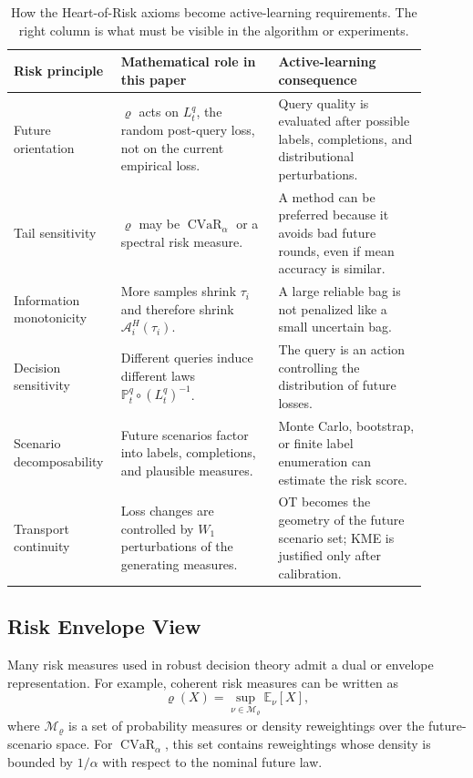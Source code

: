 \documentclass[10pt,journal]{IEEEtran}
\DeclareMathOperator{\CVaR}{CVaR}
\newcommand{\E}{\mathbb{E}}
\newcommand{\Prob}{\mathbb{P}}
\newcommand{\Mcal}{\mathcal{M}}
\newcommand{\risk}{\varrho}
\newcommand{\Acal}{\mathcal{A}}
\begin{document}
\begin{table}[t]
\centering
\caption{How the Heart-of-Risk axioms become active-learning requirements. The right column is what must be visible in the algorithm or experiments.}
\label{tab:hr-axioms-dal}
\small
\begin{tabular}{p{0.20\linewidth}p{0.36\linewidth}p{0.34\linewidth}}
\toprule
Risk principle & Mathematical role in this paper & Active-learning consequence \\
\midrule
Future orientation & $\risk$ acts on $L_t^q$, the random post-query loss, not on the current empirical loss. & Query quality is evaluated after possible labels, completions, and distributional perturbations. \\
Tail sensitivity & $\risk$ may be $\CVaR_\alpha$ or a spectral risk measure. & A method can be preferred because it avoids bad future rounds, even if mean accuracy is similar. \\
Information monotonicity & More samples shrink $\tau_i$ and therefore shrink $\Acal_i^H(\tau_i)$. & A large reliable bag is not penalized like a small uncertain bag. \\
Decision sensitivity & Different queries induce different laws $\Prob_t^q\circ(L_t^q)^{-1}$. & The query is an action controlling the distribution of future losses. \\
Scenario decomposability & Future scenarios factor into labels, completions, and plausible measures. & Monte Carlo, bootstrap, or finite label enumeration can estimate the risk score. \\
Transport continuity & Loss changes are controlled by $W_1$ perturbations of the generating measures. & OT becomes the geometry of the future scenario set; KME is justified only after calibration. \\
\bottomrule
\end{tabular}
\end{table}

\subsection{Risk Envelope View}
\label{subsec:risk-envelope}

Many risk measures used in robust decision theory admit a dual or envelope representation. For example, coherent risk measures can be written as
\begin{equation}
\label{eq:risk-envelope}
    \risk(X)=\sup_{\nu\in\Mcal_\risk}\E_\nu[X],
\end{equation}
where $\Mcal_\risk$ is a set of probability measures or density reweightings over the future-scenario space. For $\CVaR_\alpha$, this set contains reweightings whose density is bounded by $1/\alpha$ with respect to the nominal future law.
\end{document}
